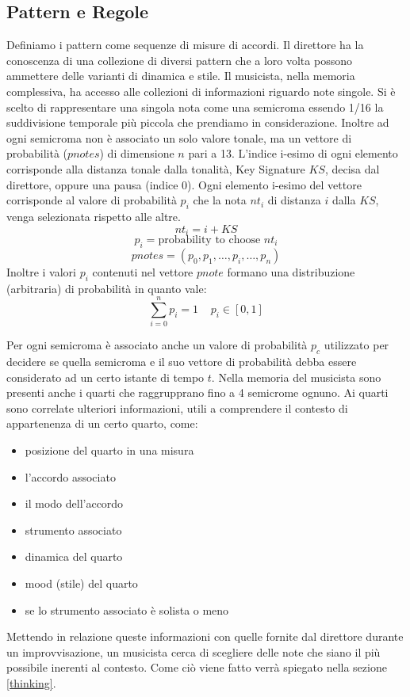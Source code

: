 \subsection{Pattern e Regole}
\label{patterneregole}
Definiamo i pattern come sequenze di misure di accordi. 
Il direttore ha la conoscenza di una collezione di diversi pattern che
a loro volta possono ammettere delle varianti di dinamica e stile.
Il musicista, nella memoria complessiva, ha accesso alle collezioni di
informazioni riguardo note singole. 
Si è scelto di rappresentare una singola nota come una semicroma essendo 
1/16 la suddivisione temporale più piccola che prendiamo in considerazione.
Inoltre ad ogni semicroma non è associato un solo valore tonale, ma un
vettore di probabilità ($pnotes$) di dimensione $n$ pari a 13. L'indice i-esimo
di ogni elemento corrisponde alla distanza tonale dalla tonalità, 
Key Signature $KS$, decisa dal direttore, oppure una pausa (indice 0). 
Ogni elemento i-esimo del vettore 
corrisponde al valore di probabilità $p_i$ che la nota $nt_i$ di distanza 
$i$ dalla $KS$, venga selezionata rispetto alle altre.
\[nt_i = i + KS \]
\[p_i = \text{probability to choose  } nt_i \]
\begin{equation}
\label{eq-pnotes}
pnotes = (p_0, p_1,  \ldots , p_i, \ldots, p_n)
\end{equation}
Inoltre i valori $p_i$ contenuti nel vettore $pnote$ formano una distribuzione 
(arbitraria) di probabilità in quanto vale:
\begin{equation}
\sum_{i=0}^{n} p_i = 1 \;\;\;\; p_i \in [0, 1]
\end{equation}

Per ogni semicroma è associato anche un valore di probabilità $p_c$
utilizzato per decidere se quella semicroma e il suo vettore di
probabilità debba essere considerato ad un certo istante di tempo $t$.
Nella memoria del musicista sono presenti anche i quarti che raggrupprano 
fino a 4 semicrome ognuno. Ai quarti sono correlate ulteriori informazioni, utili
a comprendere il contesto di appartenenza di un certo quarto, come:
\begin{itemize}
\item posizione del quarto in una misura
\item l'accordo associato
\item il modo dell'accordo 
\item strumento associato
\item dinamica del quarto
\item mood (stile) del quarto
\item se lo strumento associato è solista o meno
\end{itemize}
Mettendo in relazione queste informazioni con quelle fornite dal
direttore durante un improvvisazione, un musicista cerca di 
scegliere delle note che siano il più possibile inerenti al contesto.
Come ciò viene fatto verrà spiegato nella sezione \ref{thinking}.
